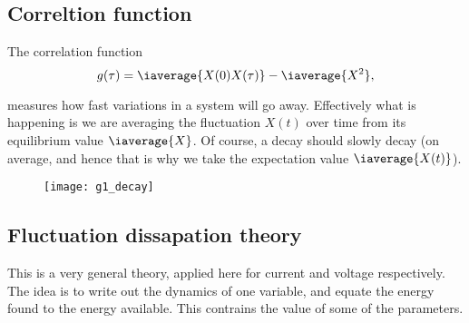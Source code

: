   \subsection{Correltion function}
  The correlation function
  \begin{equation}\label{eqn:corr1}
    g(\tau) = \iaverage{X(0)X(\tau)} - \iaverage{X^2},
  \end{equation}

  \noindent measures how  fast variations in a system will  go away.  Effectively
  what is happening is  we are averaging the fluctuation $ X(t)  $ over time from
  its equilibrium value $ \iaverage{X} $.  Of course, a decay should slowly decay
  (on  average,   and  hence  that   is  why   we  take  the   expectation  value
  $ \iaverage{X(t)} $).

\begin{figure}[h]
  \centering \texttt{[image: g1\_decay]}
\end{figure}


 \subsection{Fluctuation dissapation theory}\label{subsec:fluctuationDissapation}
 This  is  a   very  general  theory,  applied  here  for   current  and  voltage
 respectively. The idea is to write out  the dynamics of one variable, and equate
 the energy found to  the energy available.  This contrains the  value of some of
 the parameters.

